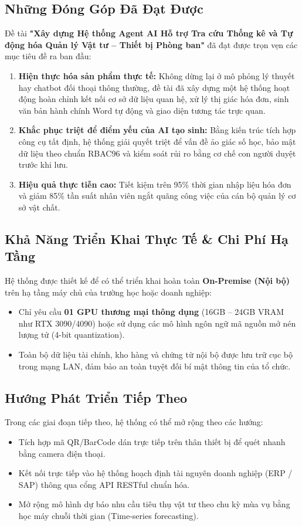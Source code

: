 \documentclass[11pt,a4paper]{article}
\begin{document}
\subsection{Những Đóng Góp Đã Đạt Được}
Đề tài \textbf{"Xây dựng Hệ thống Agent AI Hỗ trợ Tra cứu Thống kê và Tự động hóa Quản lý Vật tư -- Thiết bị Phòng ban"} đã đạt được trọn vẹn các mục tiêu đề ra ban đầu:
\begin{enumerate}[leftmargin=1.8em]
    \item \textbf{Hiện thực hóa sản phẩm thực tế:} Không dừng lại ở mô phỏng lý thuyết hay chatbot đối thoại thông thường, đề tài đã xây dựng một hệ thống hoạt động hoàn chỉnh kết nối cơ sở dữ liệu quan hệ, xử lý thị giác hóa đơn, sinh văn bản hành chính Word tự động và giao diện tương tác trực quan.
    \item \textbf{Khắc phục triệt để điểm yếu của AI tạo sinh:} Bằng kiến trúc tích hợp công cụ tất định, hệ thống giải quyết triệt để vấn đề ảo giác số học, bảo mật dữ liệu theo chuẩn RBAC96 và kiểm soát rủi ro bằng cơ chế con người duyệt trước khi lưu.
    \item \textbf{Hiệu quả thực tiễn cao:} Tiết kiệm trên 95\% thời gian nhập liệu hóa đơn và giảm 85\% tần suất nhân viên ngắt quãng công việc của cán bộ quản lý cơ sở vật chất.
\end{enumerate}

\subsection{Khả Năng Triển Khai Thực Tế \& Chi Phí Hạ Tầng}
Hệ thống được thiết kế để có thể triển khai hoàn toàn \textbf{On-Premise (Nội bộ)} trên hạ tầng máy chủ của trường học hoặc doanh nghiệp:
\begin{itemize}[leftmargin=1.5em]
    \item Chỉ yêu cầu \textbf{01 GPU thương mại thông dụng} (16GB -- 24GB VRAM như RTX 3090/4090) hoặc sử dụng các mô hình ngôn ngữ mã nguồn mở nén lượng tử (4-bit quantization).
    \item Toàn bộ dữ liệu tài chính, kho hàng và chứng từ nội bộ được lưu trữ cục bộ trong mạng LAN, đảm bảo an toàn tuyệt đối bí mật thông tin của tổ chức.
\end{itemize}

\subsection{Hướng Phát Triển Tiếp Theo}
Trong các giai đoạn tiếp theo, hệ thống có thể mở rộng theo các hướng:
\begin{itemize}[leftmargin=1.5em]
    \item Tích hợp mã QR/BarCode dán trực tiếp trên thân thiết bị để quét nhanh bằng camera điện thoại.
    \item Kết nối trực tiếp vào hệ thống hoạch định tài nguyên doanh nghiệp (ERP / SAP) thông qua cổng API RESTful chuẩn hóa.
    \item Mở rộng mô hình dự báo nhu cầu tiêu thụ vật tư theo chu kỳ mùa vụ bằng học máy chuỗi thời gian (Time-series forecasting).
\end{itemize}
\end{document}
